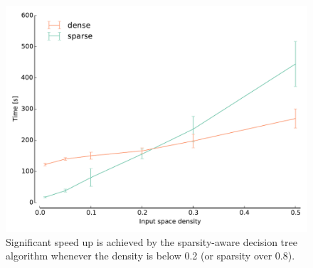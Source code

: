 \begin{figure}[h]
\centering
\includegraphics[scale=0.45]{images/density.pdf}
\caption{Significant speed up is achieved by the sparsity-aware decision tree
         algorithm whenever the density is below 0.2 (or sparsity over 0.8).}
\label{fig:density}
\end{figure}
